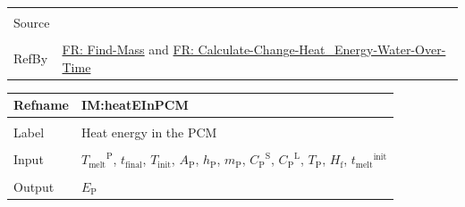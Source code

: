 \documentclass[12pt]{article}
\begin{document}
\begin{minipage}{\textwidth}
\begin{tabular}{>{\raggedright}p{}>{\raggedright\arraybackslash}p{}}
\\ \midrule \\
Source & \cite{koothoor2013}
         
\\ \midrule \\
RefBy & \hyperref[findMass]{FR: Find-Mass} and \hyperref[calcChgHeatEnergyWtrOverTime]{FR: Calculate-Change-Heat\_Energy-Water-Over-Time}
        
\\ \bottomrule
\end{tabular}
\end{minipage}

\vspace{\baselineskip}
\noindent
\begin{minipage}{\textwidth}
\begin{tabular}{>{\raggedright}p{}>{\raggedright\arraybackslash}p{}}
\toprule \textbf{Refname} & \textbf{IM:heatEInPCM}
\label{IM:heatEInPCM}
\\ \midrule \\
Label & Heat energy in the PCM
        
\\ \midrule \\
Input & ${{T_{\text{melt}}}^{\text{P}}}$, ${t_{\text{final}}}$, ${T_{\text{init}}}$, ${A_{\text{P}}}$, ${h_{\text{P}}}$, ${m_{\text{P}}}$, ${{C_{\text{P}}}^{\text{S}}}$, ${{C_{\text{P}}}^{\text{L}}}$, ${T_{\text{P}}}$, ${H_{\text{f}}}$, ${{t_{\text{melt}}}^{\text{init}}}$
        
\\ \midrule \\
Output & ${E_{\text{P}}}$
         

\end{tabular}
\end{minipage}
\end{document}
